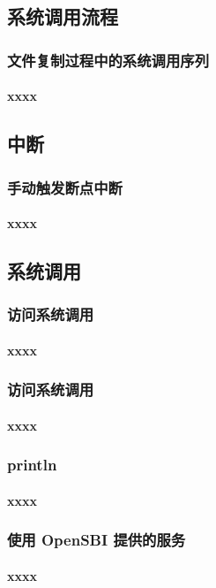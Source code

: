 \subsection{系统调用流程}
\begin{frame}
	\frametitle{文件复制过程中的系统调用序列}
	\framesubtitle{xxxx}
\end{frame}
% 
\subsection{中断}
% 
\begin{frame}
	\frametitle{手动触发断点中断}
	\framesubtitle{xxxx}
\end{frame}
% 
\subsection{系统调用}
\begin{frame}
	\frametitle{访问系统调用}
	\framesubtitle{xxxx}
\end{frame}
% 
\begin{frame}
	\frametitle{访问系统调用}
	\framesubtitle{xxxx}
\end{frame}
% 
\begin{frame}
	\frametitle{println}
	\framesubtitle{xxxx}
\end{frame}
% 
\begin{frame}
	\frametitle{使用 OpenSBI 提供的服务}
	\framesubtitle{xxxx}
\end{frame}

